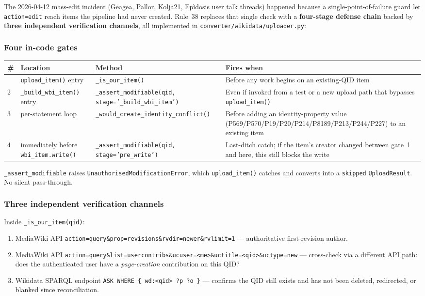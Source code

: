 \documentclass[12pt]{article}
\newcommand{\filepath}[1]{\texttt{\small #1}}
\newcommand{\code}[1]{\texttt{#1}}
\begin{document}
The 2026-04-12 mass-edit incident (Geagea, Pallor, Kolja21, Epìdosis user talk threads) happened because a single-point-of-failure guard let \code{action=edit} reach items the pipeline had never created. Rule~38 replaces that single check with a \textbf{four-stage defense chain} backed by \textbf{three independent verification channels}, all implemented in \filepath{converter/wikidata/uploader.py}:

\subsubsection*{Four in-code gates}

\begin{longtable}{|l|p{4.5cm}|p{3.5cm}|p{4.5cm}|}
\hline
\textbf{\#} & \textbf{Location} & \textbf{Method} & \textbf{Fires when} \\
\hline
\endfirsthead
\hline
\endhead
\hline
\endfoot
1 & \code{upload\_item()} entry & \code{\_is\_our\_item()} & Before any work begins on an existing-QID item \\
\hline
2 & \code{\_build\_wbi\_item()} entry & \code{\_assert\_modifiable(qid, stage='\_build\_wbi\_item')} & Even if invoked from a test or a new upload path that bypasses \code{upload\_item()} \\
\hline
3 & per-statement loop & \code{\_would\_create\_identity\_conflict()} & Before adding an identity-property value (P569/P570/P19/P20/P214/P8189/P213/P244/P227) to an existing item \\
\hline
4 & immediately before \code{wbi\_item.write()} & \code{\_assert\_modifiable(qid, stage='pre\_write')} & Last-ditch catch; if the item's creator changed between gate~1 and here, this still blocks the write \\
\hline
\end{longtable}

\code{\_assert\_modifiable} raises \code{UnauthorisedModificationError}, which \code{upload\_item()} catches and converts into a \code{skipped} \code{UploadResult}. No silent pass-through.

\subsubsection*{Three independent verification channels}

Inside \code{\_is\_our\_item(qid)}:

\begin{enumerate}
\item MediaWiki API \code{action=query\&prop=revisions\&rvdir=newer\&rvlimit=1} --- authoritative first-revision author.
\item MediaWiki API \code{action=query\&list=usercontribs\&ucuser=<me>\&uctitle=<qid>\&uctype=new} --- cross-check via a different API path: does the authenticated user have a \emph{page-creation} contribution on this QID?
\item Wikidata SPARQL endpoint \code{ASK WHERE \{\ wd:<qid> ?p ?o\ \}} --- confirms the QID still exists and has not been deleted, redirected, or blanked since reconciliation.
\end{enumerate}
\end{document}
